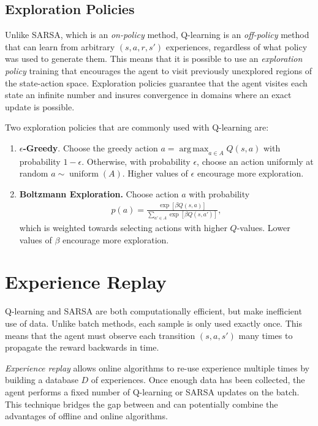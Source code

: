 \documentclass[11pt]{article}
\numberwithin{equation}{section}
\numberwithin{figure}{section}
\DeclareMathOperator*{\argmax}{arg\,max}
\DeclareMathOperator{\uniform}{uniform}
\begin{document}

\subsection{Exploration Policies}
Unlike SARSA, which is an \emph{on-policy} method,  Q-learning is an
\emph{off-policy} method that can learn from arbitrary $(s, a, r, s')$
experiences, regardless of what policy was used to generate them. This means
that it is possible to use an \emph{exploration policy} training that
encourages the agent to visit previously unexplored regions of the state-action
space. Exploration policies guarantee that the agent visites each state an
infinite number and insures convergence in domains where an exact update is
possible.

Two exploration policies that are commonly used with Q-learning are:
\begin{enumerate}
    \item \textbf{$\epsilon$-Greedy}. Choose the greedy action $a = \argmax_{a
        \in A} Q(s, a)$ with probability $1 - \epsilon$. Otherwise, with probability
        $\epsilon$, choose an action uniformly at random $a \sim \uniform(A)$. Higher
        values of $\epsilon$ encourage more exploration.
    \item \textbf{Boltzmann Exploration.} Choose action $a$ with probability
        \begin{align*}
            p(a) = \frac{\exp\left[ \beta Q(s, a) \right]}
                        {\sum_{a' \in A} \exp\left[ \beta Q(s, a') \right]},
        \end{align*}
        which is weighted towards selecting actions with higher $Q$-values. Lower
        values of $\beta$ encourage more exploration.
\end{enumerate}

\section{Experience Replay}
Q-learning and SARSA are both computationally efficient, but make inefficient
use of data. Unlike batch methods, each sample is only used exactly once. This
means that the agent must observe each transition $(s, a, s')$ many times to
propagate the reward backwards in time.

\emph{Experience replay} allows online algorithms to re-use experience multiple
times by building a database $D$ of experiences.  Once enough data has been
collected, the agent performs a fixed number of Q-learning or SARSA updates on
the batch. This technique bridges the gap between and can potentially combine the
advantages of offline and online algorithms.
\end{document}
